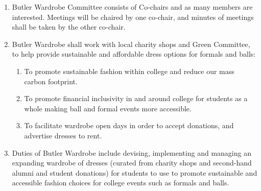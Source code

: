 \begin{enumerate}
    \item Butler Wardrobe Committee consists of Co-chairs and as many members are interested. Meetings will be chaired by one co-chair, and minutes of meetings shall be taken by the other co-chair.
    \item Butler Wardrobe shall work with local charity shops and Green Committee, to help provide sustainable and affordable dress options for formals and balls: 
    \begin{enumerate}
            \item To promote sustainable fashion within college and reduce our mass carbon footprint.
            \item To promote financial inclusivity in and around college for students as a whole making ball and formal events more accessible.
            \item To facilitate wardrobe open days in order to accept donations, and advertise dresses to rent.
    \end{enumerate}
    \item Duties of Butler Wardrobe include devising, implementing and managing an expanding wardrobe of dresses (curated from charity shops and second-hand alumni and student donations) for students to use to promote sustainable and accessible fashion choices for college events such as formals and balls.
\end{enumerate}

